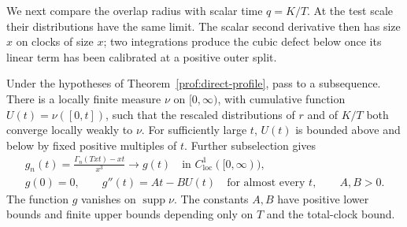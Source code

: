 We next compare the overlap radius with scalar time $q=K/T$.
At the test scale their distributions have the same limit. The scalar
second derivative then has size $x$ on clocks of size $x$; two
integrations produce the cubic defect below once its linear term has
been calibrated at a positive outer split.

\begin{lemma}
\label{prof:scalar-compactness}
Under the hypotheses of Theorem~\ref{prof:direct-profile}, pass to a
subsequence. There is a locally finite measure $\nu$ on $[0,\infty)$,
with cumulative function $U(t)=\nu([0,t])$, such that the rescaled
distributions of $r$ and of $K/T$ both converge locally weakly to $\nu$.
For sufficiently large $t$, $U(t)$ is bounded above and below by fixed
positive multiples of $t$. Further subselection gives
\begin{equation}
 \begin{gathered}
 g_n(t)=\frac{\Gamma_n(Txt)-xt}{x^3}
       \longrightarrow g(t)\quad\text{in }C^1_{\mathrm{loc}}([0,\infty)),
 \\
 g(0)=0,\qquad g''(t)=At-BU(t)\quad\text{for almost every }t,
 \qquad A,B>0.
 \end{gathered}
 \tag{29}\label{eq:29}
\end{equation}
The function $g$ vanishes on $\operatorname{supp}\nu$. The constants
$A,B$ have positive lower bounds and finite upper bounds depending
only on $T$ and the total-clock bound.
\end{lemma}

